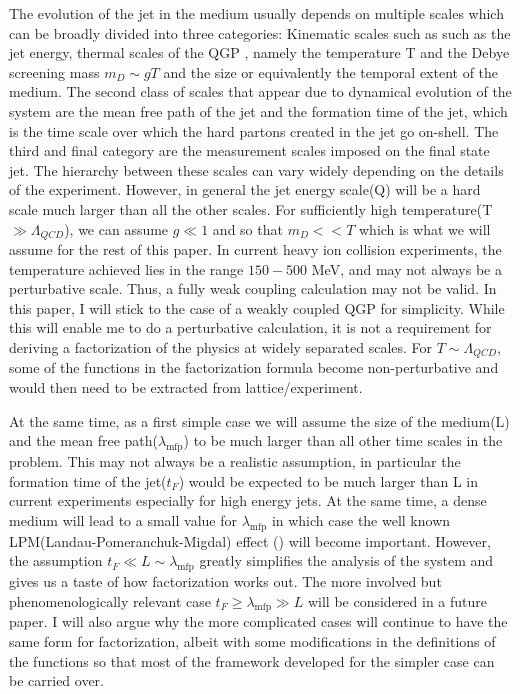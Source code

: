 \documentclass[letter,11pt]{article}
\begin{document}
The evolution of the jet in the medium usually depends on multiple scales which can be broadly divided into three categories: Kinematic scales such as such as the jet energy, thermal scales of the QGP , namely the temperature T and the Debye screening mass $m_D \sim gT$ and the size or equivalently the temporal extent of the medium. The second class of scales that appear due to dynamical evolution of the system are the mean free path of the jet and the formation time of the jet, which is the time scale over which the hard partons created in the jet go on-shell. The third and final category are the measurement scales imposed on the final state jet.
The hierarchy between these scales can vary widely depending on the details of the experiment. However, in general the jet energy scale(Q) will be a hard scale much larger than all the other scales. For sufficiently high temperature(T $\gg \Lambda_{QCD}$), we can assume $g \ll 1$ and so that $m_D << T$ which is what we will assume for the rest of this paper. In current heavy ion collision experiments, the temperature achieved lies in the range $150 - 500$ MeV, and may not always be a perturbative scale. Thus, a fully weak coupling calculation may not be valid. In this paper, I will stick to the case of a weakly coupled QGP for simplicity. While this will enable me to do a perturbative calculation, it is not a requirement for deriving a factorization of the physics at widely separated scales. For $T \sim \Lambda_{QCD}$, some of the functions in the factorization formula become non-perturbative and would then need to be extracted from lattice/experiment.

  At the same time, as a first simple case we will assume the size of the medium(L) and the mean free path($\lambda_{\text{mfp}}$) to be much larger than all other time scales in the problem. This may not always be a realistic assumption, in particular the formation time of the jet($t_F$) would be expected to be much larger than L in current experiments especially for high energy jets. At the same time, a dense medium will lead to a small value for $\lambda_{\text{mfp}}$ in which case the well known LPM(Landau-Pomeranchuk-Migdal) effect (\cite{CaronHuot:2010bp,Ke:2018jem,Mehtar-Tani:2019ygg,Arnold:2015qya,Arnold:2016kek}) will become important. However, the assumption $t_F \ll L \sim \lambda_{\text{mfp}}$ greatly simplifies the analysis of the system and gives us a taste of how factorization works out. The more involved but phenomenologically relevant case $t_F \geq \lambda_{\text{mfp}} \gg L$ will be considered in a future paper. I will also argue why the more complicated cases will continue to have the same form for factorization, albeit with some modifications in the definitions of the functions so that most of the framework developed for the simpler case can be carried over.
\end{document}
